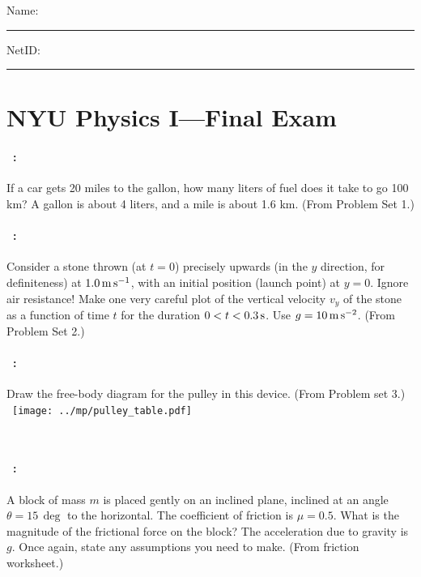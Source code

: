 \documentclass[12pt]{article} 
\begin{document}
\noindent
Name: \rule[-1ex]{0.55\textwidth}{0.1pt}
NetID: \rule[-1ex]{0.2\textwidth}{0.1pt}

\section*{NYU Physics I---Final Exam}

\paragraph{\problemname~\theproblem:}%
If a car gets 20 miles to the gallon, how many liters of fuel
does it take to go 100 km? A gallon is about 4 liters, and a mile is
about 1.6 km.
(From Problem Set 1.)

\vfill

\paragraph{\problemname~\theproblem:}%
Consider a stone thrown (at $t=0$) precisely upwards (in the $y$
direction, for definiteness) at $1.0\,\mathrm{m}\,\mathrm{s}^{-1}$, with an initial
position (launch point) at $y=0$.  Ignore air resistance! Make one
very careful plot of the vertical velocity $v_y$ of the stone as a
function of time $t$ for the duration $0<t<0.3\,\mathrm{s}$. Use
$g=10\,\mathrm{m}\,\mathrm{s}^{-2}$.
(From Problem Set 2.)

\vfill

\paragraph{\problemname~\theproblem:}%
Draw the free-body diagram for the pulley in this device.
(From Problem set 3.)\\
~\hfill\texttt{[image: ../mp/pulley\_table.pdf]}\hfill~

\vfill
~
\clearpage

\paragraph{\problemname~\theproblem:}%
A block of mass $m$ is placed gently on an inclined
plane, inclined at an angle $\theta=15\,\deg$ to the horizontal. The
coefficient of friction is $\mu=0.5$. What is the magnitude of the
frictional force on the block? The acceleration due to gravity is $g$.
Once again, state any assumptions you need to make.
(From friction worksheet.)
\end{document}
